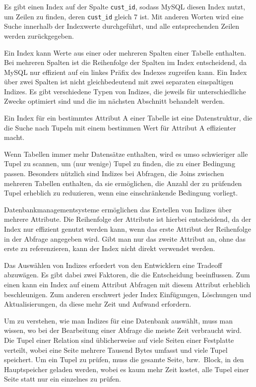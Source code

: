 Es gibt einen Index auf der Spalte \texttt{cust\_id}, sodass MySQL diesen Index nutzt, um Zeilen zu finden, deren \texttt{cust\_id} gleich 7 ist.
Mit anderen Worten wird eine Suche innerhalb der Indexwerte durchgeführt, und alle entsprechenden Zeilen werden zurückgegeben.

Ein Index kann Werte aus einer oder mehreren Spalten einer Tabelle enthalten.
Bei mehreren Spalten ist die Reihenfolge der Spalten im Index entscheidend, da MySQL nur effizient auf ein linkes Präfix des Indexes zugreifen kann.
Ein Index über zwei Spalten ist nicht gleichbedeutend mit zwei separaten einspaltigen Indizes.
Es gibt verschiedene Typen von Indizes, die jeweils für unterschiedliche Zwecke optimiert sind und die im nächsten Abschnitt behandelt werden.

Ein Index für ein bestimmtes Attribut A einer Tabelle ist eine Datenstruktur, die die Suche nach Tupeln mit einem bestimmen Wert für Attribut A effizienter macht.

Wenn Tabellen immer mehr Datensätze enthalten, wird es umso schwieriger alle Tupel zu scannen, um (nur wenige) Tupel zu finden, die zu einer Bedingung passen.
Besonders nützlich sind Indizes bei Abfragen, die Joins zwischen mehreren Tabellen enthalten, da sie ermöglichen, die Anzahl der zu prüfenden Tupel erheblich zu reduzieren, wenn eine einschränkende Bedingung vorliegt.

Datenbankmanagementsysteme ermöglichen das Erstellen von Indizes über mehrere Attribute.
Die Reihenfolge der Attribute ist hierbei entscheidend, da der Index nur effizient genutzt werden kann, wenn das erste Attribut der Reihenfolge in der Abfrage angegeben wird.
Gibt man nur das zweite Attribut an, ohne das erste zu referenzieren, kann der Index nicht direkt verwendet werden.

Das Auswählen von Indizes erfordert von den Entwicklern eine Tradeoff abzuwägen.
Es gibt dabei zwei Faktoren, die die Entscheidung beeinflussen.
Zum einen kann ein Index auf einem Attribut Abfragen mit diesem Attribut erheblich beschleunigen.
Zum anderen erschwert jeder Index Einfügungen, Löschungen und Aktualisierungen, da diese mehr Zeit und Aufwand erfordern.

Um zu verstehen, wie man Indizes für eine Datenbank auswählt, muss man wissen, wo bei der Bearbeitung einer Abfrage die meiste Zeit verbraucht wird.
Die Tupel einer Relation sind üblicherweise auf viele Seiten einer Festplatte verteilt, wobei eine Seite mehrere Tausend Bytes umfasst und viele Tupel speichert.
Um ein Tupel zu prüfen, muss die gesamte Seite, bzw.\ Block, in den Hauptspeicher geladen werden, wobei es kaum mehr Zeit kostet, alle Tupel einer Seite statt nur ein einzelnes zu prüfen.

